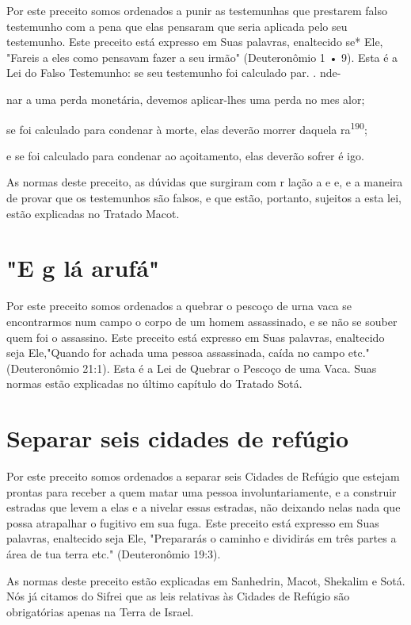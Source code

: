 \begin{itemize}
\begin{enumrate}
\begin{itemize}
\begin{itemize}
\begin{itemize}
Por este preceito somos ordenados a punir as testemunhas que pres­tarem
falso testemunho com a pena que elas pensaram que seria aplicada pelo
seu testemunho. Este preceito está expresso em Suas palavras, enaltecido
se* Ele, "Fareis a eles como pensavam fazer a seu irmão" (Deuteronômio 1
• 9). Esta é a Lei do Falso Testemunho: se seu testemunho foi calculado
par. . nde-

nar a uma perda monetária, devemos aplicar-lhes uma perda no mes alor;

se foi calculado para condenar à morte, elas deverão morrer daquela
ra\textsuperscript{190};

e se foi calculado para condenar ao açoitamento, elas deverão sofrer é
igo.

As normas deste preceito, as dúvidas que surgiram com r lação a e e, e a
maneira de provar que os testemunhos são falsos, e que estão, portanto,
sujeitos a esta lei, estão explicadas no Tratado Macot.

\section{"E g lá arufá"}

Por este preceito somos ordenados a quebrar o pescoço de urna vaca se
encontrarmos num campo o corpo de um homem assassinado, e se não se
souber quem foi o assassino. Este preceito está expresso em Suas
pala­vras, enaltecido seja Ele,"Quando for achada uma pessoa
assassinada, caída no campo etc." (Deuteronômio 21:1). Esta é a Lei de
Quebrar o Pescoço de uma Vaca. Suas normas estão explicadas no último
capítulo do Tratado Sotá.

\section{Separar seis cidades de refúgio}

Por este preceito somos ordenados a separar seis Cidades de Refú­gio que
estejam prontas para receber a quem matar uma pessoa involuntaria­mente,
e a construir estradas que levem a elas e a nivelar essas estradas, não
deixando nelas nada que possa atrapalhar o fugitivo em sua fuga. Este
preceito está expresso em Suas palavras, enaltecido seja Ele,
"Prepararás o caminho e dividirás em três partes a área de tua terra
etc." (Deuteronômio 19:3).

As normas deste preceito estão explicadas em Sanhedrin, Macot, She­kalim
e Sotá. Nós já citamos do Sifrei que as leis relativas às Cidades de
Refúgio são obrigatórias apenas na Terra de Israel.


\end{itemize}
\end{itemize}
\end{itemize}
\end{enumrate}
\end{itemize}
